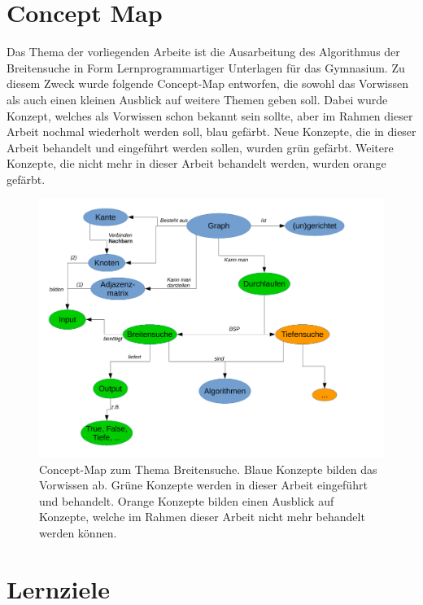 \section{Concept Map}

Das Thema der vorliegenden Arbeite ist die Ausarbeitung des Algorithmus der Breitensuche in Form Lernprogrammartiger Unterlagen für das Gymnasium.  
Zu diesem Zweck wurde folgende Concept-Map entworfen, die sowohl das Vorwissen als auch einen kleinen Ausblick auf weitere Themen geben soll.
Dabei wurde Konzept, welches als Vorwissen schon bekannt sein sollte, aber im Rahmen dieser Arbeit nochmal wiederholt werden soll, blau gefärbt. 
Neue Konzepte, die in dieser Arbeit behandelt und eingeführt werden sollen, wurden grün gefärbt. 
Weitere Konzepte, die nicht mehr in dieser Arbeit behandelt werden, wurden orange gefärbt. 

\begin{figure}[htb]
\begin{center}
\includegraphics[width=.99\textwidth]{../cmap/bsuche_cmap.pdf}
\caption{Concept-Map zum Thema Breitensuche.
Blaue Konzepte bilden das Vorwissen ab. Grüne Konzepte werden in dieser Arbeit eingeführt und behandelt. Orange Konzepte bilden einen Ausblick auf Konzepte, welche im Rahmen dieser Arbeit nicht mehr behandelt werden können. 
}
\label{fig:cmap}
\end{center}
\end{figure}


\section{Lernziele}

